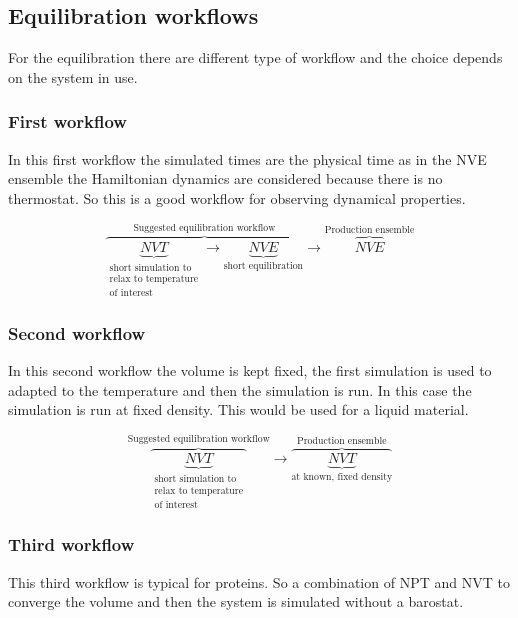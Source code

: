 	\subsection{Equilibration workflows}
	For the equilibration there are different type of workflow and the choice depends on the system in use.

		\subsubsection{First workflow}
		In this first workflow the simulated times are the physical time as in the NVE ensemble the Hamiltonian dynamics are considered because there is no thermostat.
		So this is a good workflow for observing dynamical properties.

		$$\overbrace{\underbrace{NVT}_{\substack{\text{short simulation to}\\\text{relax to temperature}\\\text{of interest}}}\rightarrow \underbrace{NVE}_{\text{short equilibration}}}^{\text{Suggested equilibration workflow}}\rightarrow \overbrace{NVE}^{\text{Production ensemble}}$$

		\subsubsection{Second workflow}
		In this second workflow the volume is kept fixed, the first simulation is used to adapted to the temperature and then the simulation is run.
		In this case the simulation is run at fixed density.
		This would be used for a liquid material.


		$$\overbrace{\underbrace{NVT}_{\substack{\text{short simulation to}\\\text{relax to temperature}\\\text{of interest}}}}^{\text{Suggested equilibration workflow}}\rightarrow \overbrace{\underbrace{NVT}_{\text{at known, fixed density}}}^{\text{Production ensemble}}$$


		\subsubsection{Third workflow}
		This third workflow is typical for proteins.
		So a combination of NPT and NVT to converge the volume and then the system is simulated without a barostat.

